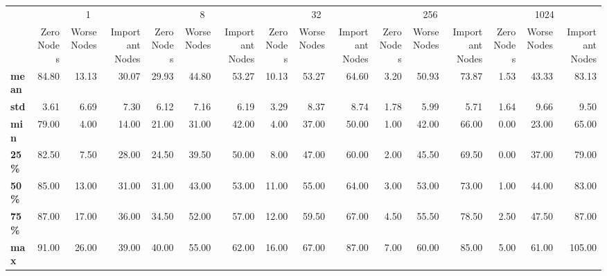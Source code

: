 \begin{tabular}{lrrrrrrrrrrrrrrr}
\toprule
{} & \multicolumn{3}{c}{1} & \multicolumn{3}{c}{8} & \multicolumn{3}{c}{32} & \multicolumn{3}{c}{256} & \multicolumn{3}{c}{1024} \\
{} & Zero Nodes & Worse Nodes & Important Nodes & Zero Nodes & Worse Nodes & Important Nodes & Zero Nodes & Worse Nodes & Important Nodes & Zero Nodes & Worse Nodes & Important Nodes & Zero Nodes & Worse Nodes & Important Nodes \\
\midrule
\textbf{mean} &      84.80 &       13.13 &           30.07 &      29.93 &       44.80 &           53.27 &      10.13 &       53.27 &           64.60 &       3.20 &       50.93 &           73.87 &       1.53 &       43.33 &           83.13 \\
\textbf{std } &       3.61 &        6.69 &            7.30 &       6.12 &        7.16 &            6.19 &       3.29 &        8.37 &            8.74 &       1.78 &        5.99 &            5.71 &       1.64 &        9.66 &            9.50 \\
\textbf{min } &      79.00 &        4.00 &           14.00 &      21.00 &       31.00 &           42.00 &       4.00 &       37.00 &           50.00 &       1.00 &       42.00 &           66.00 &       0.00 &       23.00 &           65.00 \\
\textbf{25\% } &      82.50 &        7.50 &           28.00 &      24.50 &       39.50 &           50.00 &       8.00 &       47.00 &           60.00 &       2.00 &       45.50 &           69.50 &       0.00 &       37.00 &           79.00 \\
\textbf{50\% } &      85.00 &       13.00 &           31.00 &      31.00 &       43.00 &           53.00 &      11.00 &       55.00 &           64.00 &       3.00 &       53.00 &           73.00 &       1.00 &       44.00 &           83.00 \\
\textbf{75\% } &      87.00 &       17.00 &           36.00 &      34.50 &       52.00 &           57.00 &      12.00 &       59.50 &           67.00 &       4.50 &       55.50 &           78.50 &       2.50 &       47.50 &           87.00 \\
\textbf{max } &      91.00 &       26.00 &           39.00 &      40.00 &       55.00 &           62.00 &      16.00 &       67.00 &           87.00 &       7.00 &       60.00 &           85.00 &       5.00 &       61.00 &          105.00 \\
\bottomrule
\end{tabular}
